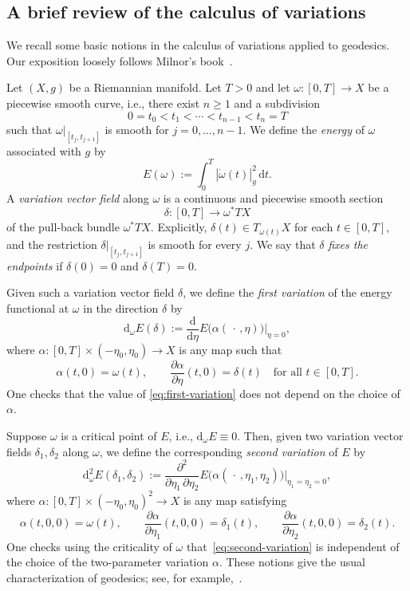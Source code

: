 \documentclass[11pt,letterpaper,oneside]{amsart}
\theoremstyle{definition}
\theoremstyle{remark}
\theoremstyle{definition}
\theoremstyle{remark}
\newcommand{\dif}{\mathrm{d}}
\begin{document}
\subsection*{A brief review of the calculus of variations}\label{sec:var calc}

We recall some basic notions in the calculus of variations applied to geodesics. Our exposition loosely follows Milnor's book~\cite{milnor1963morse}.

\medskip

Let $(X,g)$ be a Riemannian manifold.
Let $T>0$ and let $\omega: [0,T] \to X$ be a piecewise smooth curve, i.e., there exist $n \geq 1$ and a subdivision
\[
0 = t_0 < t_1 < \cdots < t_{n-1} < t_n = T
\]
such that $\omega|_{[t_j, t_{j+1}]}$ is smooth for $j = 0,\ldots, n-1$.
We define the \emph{energy} of $\omega$ associated with $g$ by
\begin{equation*}    
    E(\omega) := \int_0^T |\dot\omega(t)|_g^2 \,\dif t.
\end{equation*}
A \emph{variation vector field} along $\omega$ is a continuous and piecewise smooth section
\[
\delta: [0,T] \to \omega^*TX
\]
of the pull-back bundle $\omega^*TX$.
Explicitly, $\delta(t) \in T_{\omega(t)}X$ for each $t \in [0,T]$, and the restriction $\delta|_{[t_j,t_{j+1}]}$ is smooth for every $j$.
We say that $\delta$ \emph{fixes the endpoints} if $\delta(0)=0$ and $\delta(T)=0$.

\medskip

Given such a variation vector field $\delta$, we define the \emph{first variation} of the energy functional at $\omega$ in the direction $\delta$ by
\begin{equation}\label{eq:first-variation}
    \dif_\omega E(\delta)
    :=
    \frac{\dif}{\dif\eta} E\bigl(\alpha(\,\cdot\,,\eta)\bigr)\Big|_{\eta=0},
\end{equation}
where $\alpha : [0,T] \times (-\eta_0,\eta_0) \to X$ is any map such that
\[
    \alpha(t,0)=\omega(t),
    \qquad
    \frac{\partial \alpha}{\partial \eta}(t,0)=\delta(t)
    \quad \text{for all } t \in [0,T].
\]
One checks that the value of \eqref{eq:first-variation} does not depend on the choice of $\alpha$.

\medskip

Suppose \(\omega\) is a critical point of \(E\), i.e., $\dif_\omega E \equiv 0$. Then, given two variation vector fields $\delta_1,\delta_2$ along $\omega$, we define the corresponding \emph{second variation} of $E$ by
\begin{equation}\label{eq:second-variation}
    \dif_\omega^2 E(\delta_1,\delta_2)
    :=
    \frac{\partial^2}{\partial \eta_1\,\partial \eta_2}
    E\bigl(\alpha(\,\cdot\,,\eta_1,\eta_2)\bigr)\Big|_{\eta_1=\eta_2=0},
\end{equation}
where $\alpha : [0,T] \times (-\eta_0,\eta_0)^2 \to X$ is any map satisfying
\[
\alpha(t,0,0)=\omega(t), \qquad
\frac{\partial \alpha}{\partial \eta_1}(t,0,0)=\delta_1(t), \qquad
\frac{\partial \alpha}{\partial \eta_2}(t,0,0)=\delta_2(t).
\]
One checks using the criticality of $\omega$ that~\eqref{eq:second-variation} is independent of the choice of the two-parameter variation $\alpha$.
These notions give the usual characterization of geodesics; see, for example,~\cite[\S\S 12--13]{milnor1963morse}.
\end{document}
